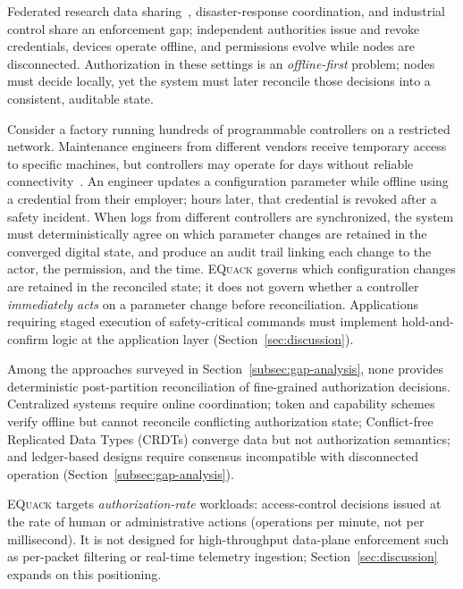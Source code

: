 \documentclass[10pt,journal,compsoc]{IEEEtran}
\newcommand{\equack}{\textsc{EQuack}}
\begin{document}
  Federated research data sharing~\cite{HASSELGREN2020104040,10.1145/3511899},
  disaster-response coordination, and industrial control share an
  enforcement gap; independent authorities issue and revoke credentials,
  devices operate offline, and permissions evolve while nodes are
  disconnected.  Authorization in these settings is an
  \emph{offline-first} problem; nodes must decide locally, yet the
  system must later reconcile those decisions into a consistent,
  auditable state.

  Consider a factory running hundreds of programmable controllers on a
  restricted network.  Maintenance engineers from different vendors
  receive temporary access to specific machines, but controllers may
  operate for days without reliable
  connectivity~\cite{9551736,s23208535}.  An engineer updates a
  configuration parameter while offline using a credential from their
  employer; hours later, that credential is revoked after a safety
  incident.  When logs from different controllers are synchronized, the
  system must deterministically agree on which parameter changes are
  retained in the converged digital state, and produce an audit trail
  linking each change to the actor, the permission, and the time.
  \equack{} governs which configuration changes are retained in the
  reconciled state; it does not govern whether a controller
  \emph{immediately acts} on a parameter change before reconciliation.
  Applications requiring staged execution of safety-critical commands
  must implement hold-and-confirm logic at the application layer
  (Section~\ref{sec:discussion}).

  Among the approaches surveyed in
  Section~\ref{subsec:gap-analysis}, none provides deterministic
  post-partition reconciliation of fine-grained authorization
  decisions.
  Centralized systems require online coordination; token and
  capability schemes verify offline but cannot reconcile
  conflicting authorization state; Conflict-free Replicated Data Types (CRDTs) converge data but
  not authorization semantics; and ledger-based designs
  require consensus incompatible with disconnected operation
  (Section~\ref{subsec:gap-analysis}).

  \equack{} targets \emph{authorization-rate} workloads:
  access-control decisions issued at the rate of human or
  administrative actions (operations per minute, not per
  millisecond). It is not designed for high-throughput data-plane
  enforcement such as per-packet filtering or real-time telemetry
  ingestion; Section~\ref{sec:discussion} expands on this
  positioning.
\end{document}
